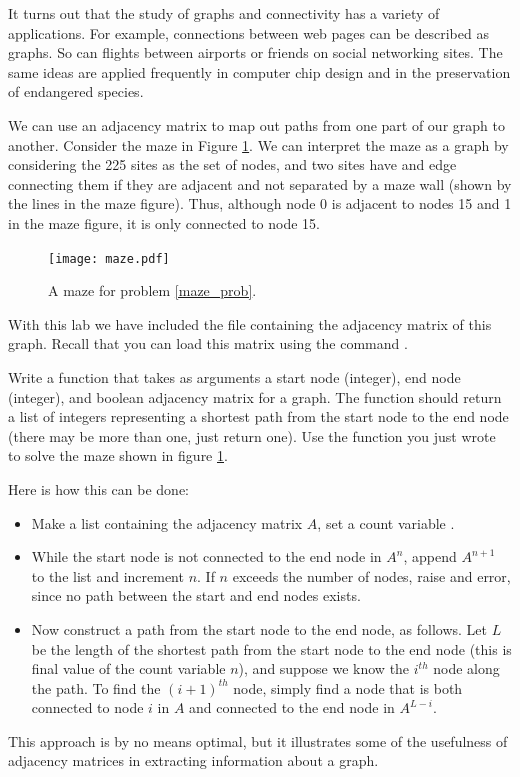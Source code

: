 It turns out that the study of graphs and connectivity has a variety of applications.
For example, connections between web pages can be described as graphs.
So can flights between airports or friends on social networking sites.
The same ideas are applied frequently in computer chip design and in the preservation of endangered species.

We can use an adjacency matrix to map out paths from one part of our graph to another.
Consider the maze in Figure \ref{maze_fig}. We can interpret the maze as a
graph by considering the 225 sites as the set of nodes, and two sites have
and edge connecting them if they are adjacent and not separated by a maze
wall (shown by the lines in the maze figure). Thus, although node 0 is
adjacent to nodes 15 and 1 in the maze figure, it is only connected to node
15.

\begin{figure}
\texttt{[image: maze.pdf]}
\caption{A maze for problem \ref{maze_prob}.}
\label{maze_fig}
\end{figure}

With this lab we have included the file  containing the adjacency matrix of this graph. Recall that you can load this matrix using the command
.

\begin{problem} \label{maze_prob}
Write a function that takes as arguments a start node (integer), end
node (integer), and boolean adjacency matrix for a graph. The function should
return a list of integers representing a shortest path from the start node
to the end node (there may be more than one, just return one).
Use the function you just wrote to solve the maze shown in figure \ref{maze_fig}.

Here is how this can be done:
\begin{itemize}
\item Make a list containing the adjacency matrix $A$, set a count variable .
\item While the start node is not connected to the end node in $A^n$,
    append $A^{n+1}$ to the list and increment $n$. If $n$ exceeds the
    number of nodes, raise and error, since no path between the start
    and end nodes exists.
\item Now construct a path from the start node to the end node, as follows.
    Let $L$ be the length of the shortest path from the start node
    to the end node (this is final value of the count variable $n$),
    and suppose we know the $i^{th}$ node along the path. To find the
    $(i+1)^{th}$ node, simply find a node that is both connected to node
    $i$ in $A$ and connected to the end node in $A^{L-i}$.
\end{itemize}

This approach is by no means optimal, but it illustrates some of the
usefulness of adjacency matrices in extracting information about a graph.
\end{problem}

